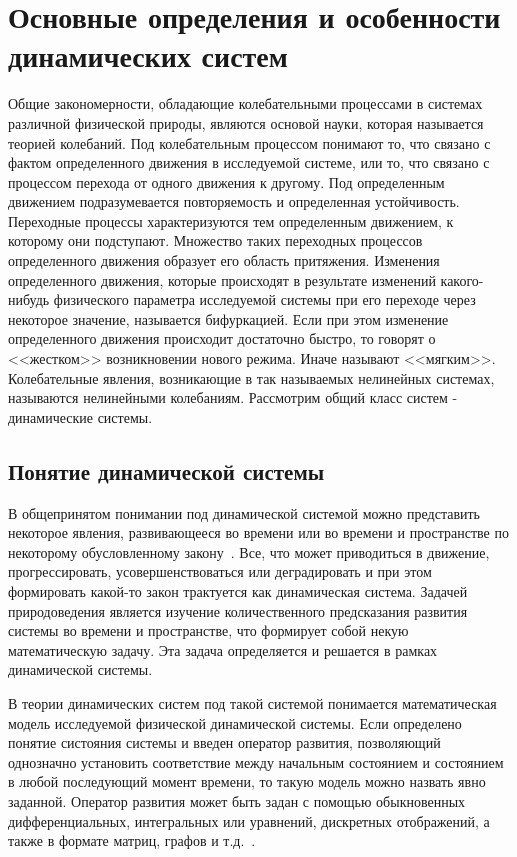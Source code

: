 \chapter{Основные определения и особенности динамических систем}

Общие закономерности, обладающие колебательными процессами в системах различной физической природы, являются основой науки, которая называется теорией колебаний. Под колебательным процессом понимают то, что связано с фактом определенного движения в исследуемой системе, или то, что связано с процессом перехода от одного движения к другому. Под определенным движением подразумевается повторяемость и определенная устойчивость. Переходные процессы характеризуются тем определенным движением, к которому они подступают. Множество таких переходных  процессов определенного движения образует его область притяжения. Изменения определенного движения, которые происходят в результате изменений какого-нибудь физического параметра исследуемой системы при его переходе через некоторое значение, называется бифуркацией. Если при этом изменение определенного движения происходит достаточно быстро, то говорят о <<жестком>> возникновении нового режима. Иначе называют <<мягким>>. Колебательные явления, возникающие в так называемых нелинейных системах, называются нелинейными колебаниям. Рассмотрим общий класс систем - динамические системы.

\section{Понятие динамической системы}

В общепринятом понимании под динамической системой можно представить некоторое явления, развивающееся во времени или во времени и пространстве по некоторому обусловленному закону~\cite{Motova}. Все, что может приводиться в движение, прогрессировать, усовершенствоваться или деградировать и при этом формировать какой-то закон трактуется как динамическая система. Задачей природоведения является изучение количественного предсказания развития системы во времени и пространстве, что формирует собой некую математическую задачу. Эта задача определяется и решается в рамках динамической системы.

 
В теории динамических систем под такой системой понимается математическая модель исследуемой физической динамической системы. Если определено понятие систояния системы и введен оператор развития, позволяющий однозначно установить соответствие между начальным состоянием  и состоянием в любой последующий момент  времени, то такую модель можно назвать явно заданной. Оператор развития может быть задан с помощью обыкновенных дифференциальных, интегральных или уравнений, дискретных отображений, а также в формате матриц, графов и т.д.~\cite{6389954}.

